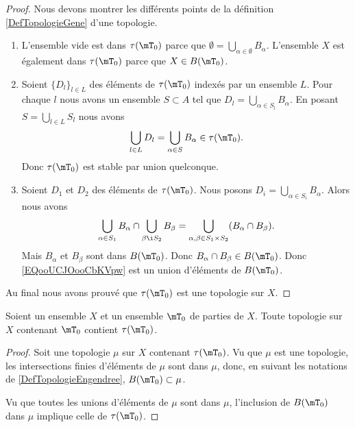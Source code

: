 \begin{proof}
    Nous devons montrer les différents points de la définition \ref{DefTopologieGene} d'une topologie.
    \begin{enumerate}
        \item
            L'ensemble vide est dans \( \tau(\mT_0)\) parce que \( \emptyset=\bigcup_{\alpha\in \emptyset}B_{\alpha}\). L'ensemble \( X\) est également dans \( \tau(\mT_0)\) parce que \( X\in B(\mT_0)\).

        \item
            Soient \( \{ D_l \}_{l\in L}\) des éléments de \( \tau(\mT_0)\) indexés par un ensemble \( L\). Pour chaque \( l\) nous avons un ensemble \( S\subset A\) tel que \( D_l=\bigcup_{\alpha\in S_l}B_{\alpha}\). En posant \( S=\bigcup_{l\in L}S_l\) nous avons
            \begin{equation}
                \bigcup_{l\in L} D_l=\bigcup_{\alpha\in S}B_{\alpha}\in \tau(\mT_0).
            \end{equation}
            Donc \( \tau(\mT_0)\) est stable par union quelconque.
        \item
            Soient \( D_1\) et \( D_2\) des éléments de \( \tau(\mT_0)\). Nous posons \( D_i=\bigcup_{\alpha\in S_i}B_{\alpha}\). Alors nous avons
            \begin{equation}        \label{EQooUCJOooCbKVpw}
                \bigcup_{\alpha\in S_1}B_{\alpha}\cap\bigcup_{\beta\i S_2}B_{\beta}=\bigcup_{\alpha,\beta\in S_1\times S_2}(B_{\alpha}\cap B_{\beta}).
            \end{equation}
            Mais \( B_{\alpha}\) et \( B_{\beta}\) sont dans \( B(\mT_0)\). Donc \( B_{\alpha}\cap B_{\beta}\in B(\mT_0)\). Donc \eqref{EQooUCJOooCbKVpw} est un union d'éléments de \( B(\mT_0)\).
    \end{enumerate}
    Au final nous avons prouvé que \( \tau(\mT_0)\) est une topologie sur \( X\).
\end{proof}

\begin{lemma}
    Soient un ensemble \( X\) et un ensemble \( \mT_0\) de parties de \( X\). Toute topologie sur \( X\) contenant \( \mT_0\) contient \( \tau(\mT_0)\).
\end{lemma}

\begin{proof}
    Soit une topologie \( \mu\) sur \( X\) contenant \( \tau(\mT_0)\). Vu que \( \mu\) est une topologie, les intersections finies d'éléments de \( \mu\) sont dans \( \mu\), donc, en suivant les notations de \ref{DefTopologieEngendree}, \( B(\mT_0)\subset \mu\).

    Vu que toutes les unions d'éléments de \( \mu\) sont dans \( \mu\), l'inclusion de \( B(\mT_0)\) dans \( \mu\) implique celle de \( \tau(\mT_0)\).
\end{proof}

